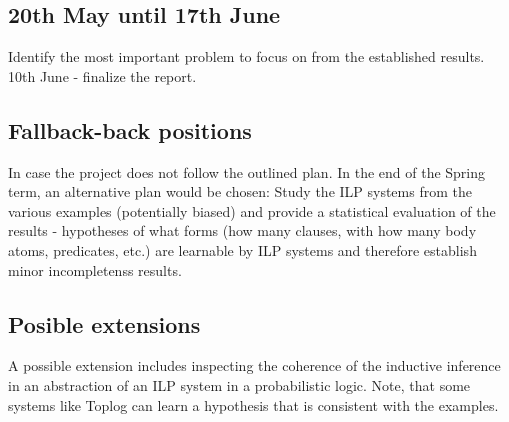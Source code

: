 \subsection{20th May until 17th June}
Identify the most important problem to focus on from the established results.
10th June - finalize the report.

\subsection{Fallback-back positions}
In case the project does not follow the outlined plan. In the end of the Spring term, an alternative plan would be chosen:
Study the ILP systems from the various examples (potentially biased) and provide a statistical evaluation of the results - hypotheses of what forms (how many clauses, with how many body atoms, predicates, etc.) are learnable by ILP systems and therefore establish minor incompletenss results.

\subsection{Posible extensions}
A possible extension includes inspecting the coherence of the inductive inference in an abstraction of an ILP system in a probabilistic logic. Note, that some systems like Toplog can learn a hypothesis that is consistent with the examples.
